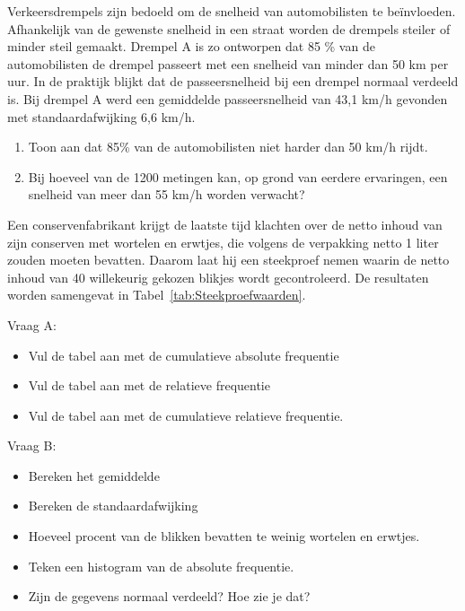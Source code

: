 \begin{exercise}
  Verkeersdrempels zijn bedoeld om de snelheid van automobilisten te be\"invloeden. Afhankelijk van de gewenste snelheid in een straat worden de drempels steiler of minder steil gemaakt. Drempel A is zo ontworpen dat 85 \% van de automobilisten de drempel passeert met een snelheid van minder dan 50 km per uur. In de praktijk blijkt dat de passeersnelheid bij een drempel normaal verdeeld is. Bij drempel A werd een gemiddelde passeersnelheid van 43,1 km/h gevonden met standaardafwijking 6,6 km/h.

  \begin{enumerate}[label=\alph*.]
    \item Toon aan dat 85\% van de automobilisten niet harder dan 50 km/h rijdt.
    \item Bij hoeveel van de 1200 metingen kan, op grond van eerdere ervaringen, een snelheid van meer dan 55 km/h worden verwacht?
  \end{enumerate}
\end{exercise}

\begin{exercise}
  Een conservenfabrikant krijgt de laatste tijd klachten over de netto inhoud van zijn conserven met wortelen en erwtjes, die volgens de verpakking netto 1 liter zouden moeten bevatten. Daarom laat hij een steekproef nemen waarin de netto inhoud van 40 willekeurig gekozen blikjes wordt gecontroleerd. De resultaten worden samengevat in Tabel~\ref{tab:Steekproefwaarden}.

Vraag A:
\begin{itemize}
  \item Vul de tabel aan met de cumulatieve absolute frequentie
  \item Vul de tabel aan met de relatieve frequentie
  \item Vul de tabel aan met de cumulatieve relatieve frequentie.
\end{itemize}
Vraag B:

\begin{itemize}
  \item Bereken het gemiddelde
  \item Bereken de standaardafwijking
  \item Hoeveel procent van de blikken bevatten te weinig wortelen en erwtjes.
  \item Teken een histogram van de absolute frequentie.
  \item Zijn de gegevens normaal verdeeld?  Hoe zie je dat?
\end{itemize}

\end{exercise}


